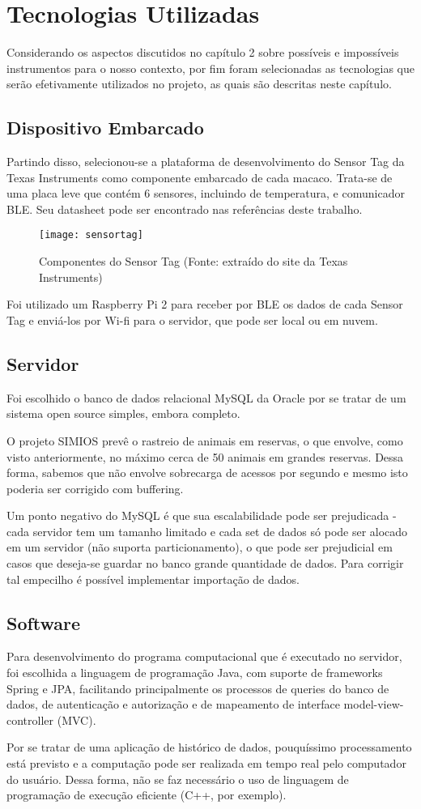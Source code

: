 \chapter{Tecnologias Utilizadas}
Considerando os aspectos discutidos no capítulo 2 sobre possíveis e impossíveis instrumentos para o nosso contexto, por fim foram selecionadas as tecnologias que serão efetivamente utilizados no projeto, as quais são descritas neste capítulo.

\section{Dispositivo Embarcado}
Partindo disso, selecionou-se a plataforma de desenvolvimento do Sensor Tag da Texas Instruments como componente embarcado de cada macaco. Trata-se de uma placa leve que contém 6 sensores, incluindo de temperatura, e comunicador BLE. Seu datasheet pode ser encontrado nas referências deste trabalho.

\begin{figure}[ht]
  \centering
    \texttt{[image: sensortag]}
  \caption{Componentes do Sensor Tag (Fonte: extraído do site da Texas Instruments)}
\end{figure}

Foi utilizado um Raspberry Pi 2 para receber por BLE os dados de cada Sensor Tag e enviá-los por Wi-fi para o servidor, que pode ser local ou em nuvem. 

\section{Servidor}
Foi escolhido o banco de dados relacional MySQL da Oracle por se tratar de um sistema open source simples, embora completo.

O projeto SIMIOS prevê o rastreio de animais em reservas, o que envolve, como visto anteriormente, no máximo cerca de 50 animais em grandes reservas. Dessa forma, sabemos que não envolve sobrecarga de acessos por segundo e mesmo isto poderia ser corrigido com buffering.

Um ponto negativo do MySQL é que sua escalabilidade pode ser prejudicada - cada servidor tem um tamanho limitado e cada set de dados só pode ser alocado em um servidor (não suporta particionamento), o que pode ser prejudicial em casos que deseja-se guardar no banco grande quantidade de dados. Para corrigir tal empecilho é possível implementar importação de dados.

\section{Software}
Para desenvolvimento do programa computacional que é executado no servidor, foi escolhida a linguagem de programação Java, com suporte de frameworks Spring e JPA, facilitando principalmente os processos de queries do banco de dados, de autenticação e autorização e de mapeamento de interface model-view-controller (MVC).

Por se tratar de uma aplicação de histórico de dados, pouquíssimo processamento está previsto e a computação pode ser realizada em tempo real pelo computador do usuário. Dessa forma, não se faz necessário o uso de linguagem de programação de execução eficiente (C++, por exemplo).
